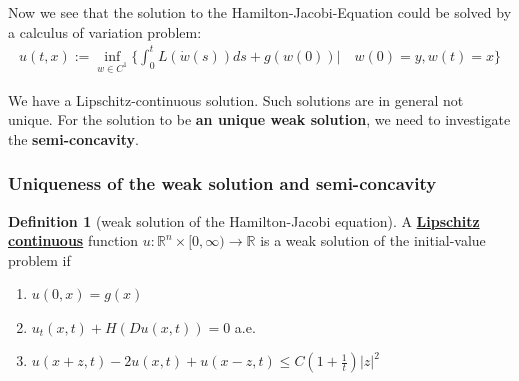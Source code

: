 \documentclass[a4paper,11pt,oneside,fleqn]{book}
\theoremstyle{definition}
\newtheorem{definition}{Definition}[section]
\theoremstyle{remark}
\begin{document}
Now we see that the solution to the Hamilton-Jacobi-Equation could be solved by a calculus of variation problem:
\begin{align*}
	u(t, x) := \inf_{w \in C^1} \bigg\{ \int_0^t L(\dot{w}(s) ) ds + g(w(0)) \bigg| \quad w(0) = y, w(t) = x\bigg\}
\end{align*}

We have a Lipschitz-continuous solution. Such solutions are in general not unique. For the solution to be \textbf{an unique weak solution}, we need to investigate the \textbf{semi-concavity}.

\subsubsection*{Uniqueness of the weak solution and semi-concavity}

\begin{definition}[weak solution of the Hamilton-Jacobi equation]
	A \underline{\textbf{Lipschitz continuous}} function $u : \mathbb{R}^n \times [0, \infty) \rightarrow \mathbb{R}$ is a weak solution of the initial-value problem if
	\begin{enumerate}
		\item $u(0, x) = g(x)$ 
		\item $u_t(x, t) + H(Du(x, t)) = 0$ a.e.
		\item $u(x + z, t) - 2u(x, t) + u(x - z, t) \le C(1 + \frac{1}{t})|z|^2 $
	\end{enumerate}
\end{definition}
\end{document}
